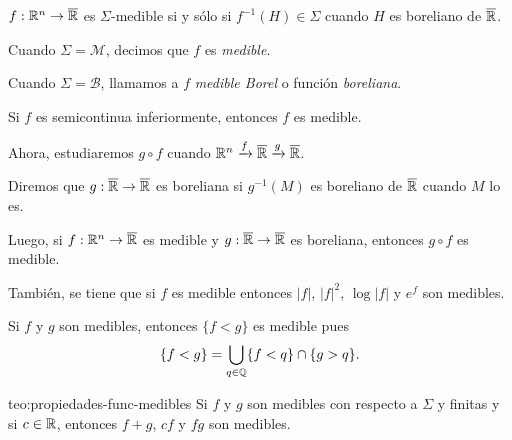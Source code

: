 \begin{proposicion}{}
$f:\mathbb{R}^n \to \overline{\mathbb{R}}$ es $\Sigma$-medible si y s\'olo si
$f^{-1}(H)\in \Sigma$ cuando $H$ es boreliano de $\overline{\mathbb{R}}$.
\end{proposicion}

Cuando $\Sigma=\mathscr{M}$, decimos que $f$ es \emph{medible}.

Cuando $\Sigma=\mathscr{B}$, llamamos a $f$ \emph{medible Borel} 
o funci\'on \emph{boreliana}.

\begin{ejercicio}{}
Si $f$ es semicontinua inferiormente, entonces $f$ es medible. 
\end{ejercicio}

Ahora, estudiaremos $g\circ f$ cuando 
$\mathbb{R}^n \xrightarrow{f}\overline{\mathbb{R}} \xrightarrow {g} \overline{\mathbb{R}}$.

\begin{definicion}{}
Diremos que $g: \overline{\mathbb{R}} \to \overline{\mathbb{R}}$ es boreliana si $g^{-1}(M)$ es boreliano de $\overline{\mathbb{R}}$ cuando $M$ lo es.
\end{definicion}

Luego, si $f:\mathbb{R}^n \to \overline{\mathbb{R}}$ es medible y $g:\overline{\mathbb{R}} \to \overline{\mathbb{R}}$ es boreliana, entonces $g\circ f$ es medible.

Tambi\'en, se tiene que si $f$ es medible entonces $|f|$, $|f|^2$, $\log|f|$ y $e^f$ son medibles. 

Si $f$ y $g$ son medibles, entonces $\{f<g\}$ es medible pues
\[
\{f<g\}=\bigcup\limits_{q \in \mathbb{Q}} \{ f<q\} \cap \{ g>q\}.
\]
\begin{teorema}{teo:propiedades-func-medibles}
Si $f$ y $g$ son medibles  con respecto a $\Sigma$ y finitas y si $c\in \mathbb{R}$, entonces
$f+g$, $cf$ y $fg$ son medibles.
\end{teorema}

